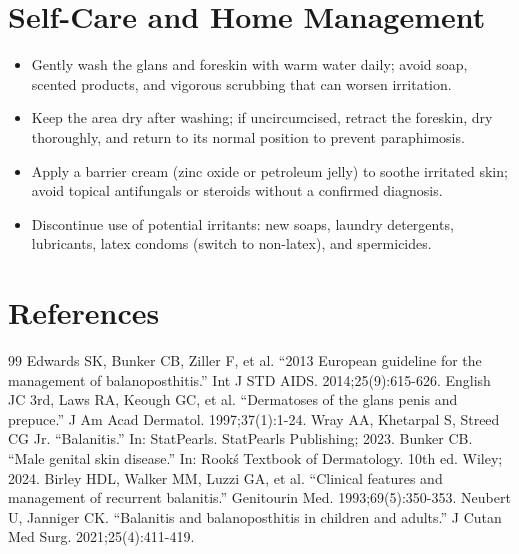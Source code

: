 \section*{Self-Care and Home Management}
\begin{itemize}
  \item Gently wash the glans and foreskin with warm water daily; avoid soap, scented products, and vigorous scrubbing that can worsen irritation.
  \item Keep the area dry after washing; if uncircumcised, retract the foreskin, dry thoroughly, and return to its normal position to prevent paraphimosis.
  \item Apply a barrier cream (zinc oxide or petroleum jelly) to soothe irritated skin; avoid topical antifungals or steroids without a confirmed diagnosis.
  \item Discontinue use of potential irritants: new soaps, laundry detergents, lubricants, latex condoms (switch to non-latex), and spermicides.
\end{itemize}

\section*{References}
\begin{thebibliography}{99}
 Edwards SK, Bunker CB, Ziller F, et al. ``2013 European guideline for the management of balanoposthitis.'' Int J STD AIDS. 2014;25(9):615-626.
 English JC 3rd, Laws RA, Keough GC, et al. ``Dermatoses of the glans penis and prepuce.'' J Am Acad Dermatol. 1997;37(1):1-24.
 Wray AA, Khetarpal S, Streed CG Jr. ``Balanitis.'' In: StatPearls. StatPearls Publishing; 2023.
 Bunker CB. ``Male genital skin disease.'' In: Rook\'s Textbook of Dermatology. 10th ed. Wiley; 2024.
 Birley HDL, Walker MM, Luzzi GA, et al. ``Clinical features and management of recurrent balanitis.'' Genitourin Med. 1993;69(5):350-353.
 Neubert U, Janniger CK. ``Balanitis and balanoposthitis in children and adults.'' J Cutan Med Surg. 2021;25(4):411-419.
\end{thebibliography}
